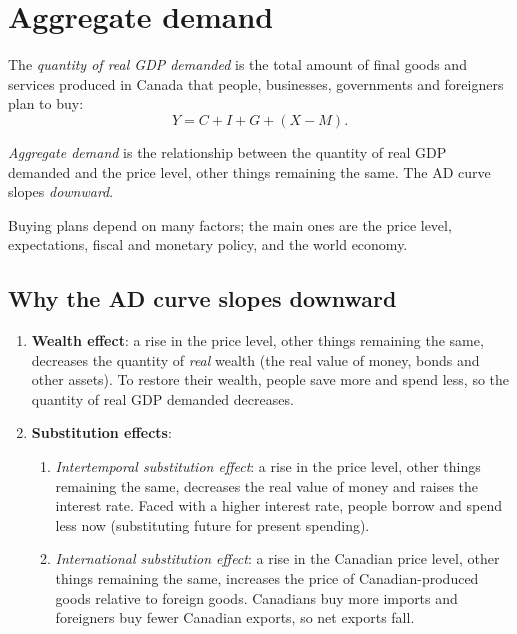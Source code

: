 \section{Aggregate demand}

The \emph{quantity of real GDP demanded} is the total amount of final goods and services
produced in Canada that people, businesses, governments and foreigners plan to buy:
\[
  Y = C + I + G + (X - M).
\]

\begin{definition}
\emph{Aggregate demand} is the relationship between the quantity of real GDP demanded and
the price level, other things remaining the same. The AD curve slopes \emph{downward}.
\end{definition}

Buying plans depend on many factors; the main ones are the price level, expectations,
fiscal and monetary policy, and the world economy.

\subsection{Why the AD curve slopes downward}

\begin{enumerate}
  \item \textbf{Wealth effect}: a rise in the price level, other things remaining the
        same, decreases the quantity of \emph{real} wealth (the real value of money,
        bonds and other assets). To restore their wealth, people save more and spend
        less, so the quantity of real GDP demanded decreases.
  \item \textbf{Substitution effects}:
        \begin{enumerate}
          \item \emph{Intertemporal substitution effect}: a rise in the price level, other
                things remaining the same, decreases the real value of money and raises
                the interest rate. Faced with a higher interest rate, people borrow and
                spend less now (substituting future for present spending).
          \item \emph{International substitution effect}: a rise in the Canadian price
                level, other things remaining the same, increases the price of
                Canadian-produced goods relative to foreign goods. Canadians buy more
                imports and foreigners buy fewer Canadian exports, so net exports fall.
        \end{enumerate}
\end{enumerate}

